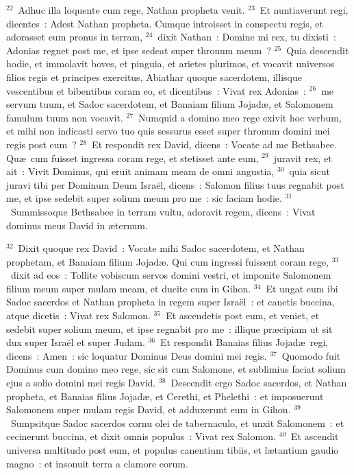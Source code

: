 ${}^{22}$~Adhuc illa loquente cum rege, Nathan propheta venit.
${}^{23}$~Et nuntiaverunt regi, dicentes~: Adest Nathan propheta. Cumque introisset in conspectu regis, et adorasset eum pronus in terram,
${}^{24}$~dixit Nathan~: Domine mi rex, tu dixisti~: Adonias regnet post me, et ipse sedeat super thronum meum~?
${}^{25}$~Quia descendit hodie, et immolavit boves, et pinguia, et arietes plurimos, et vocavit universos filios regis et principes exercitus, Abiathar quoque sacerdotem, illisque vescentibus et bibentibus coram eo, et dicentibus~: Vivat rex Adonias~:
${}^{26}$~me servum tuum, et Sadoc sacerdotem, et Banaiam filium Jojad\ae , et Salomonem famulum tuum non vocavit.
${}^{27}$~Numquid a domino meo rege exivit hoc verbum, et mihi non indicasti servo tuo quis sessurus esset super thronum domini mei regis post eum~?
${}^{28}$~Et respondit rex David, dicens~: Vocate ad me Bethsabee. Qu\ae\ cum fuisset ingressa coram rege, et stetisset ante eum,
${}^{29}$~juravit rex, et ait~: Vivit Dominus, qui eruit animam meam de omni angustia,
${}^{30}$~quia sicut juravi tibi per Dominum Deum Isra\"el, dicens~: Salomon filius tuus regnabit post me, et ipse sedebit super solium meum pro me~: sic faciam hodie.
${}^{31}$~Summissoque Bethsabee in terram vultu, adoravit regem, dicens~: Vivat dominus meus David in \ae ternum.


${}^{32}$~Dixit quoque rex David~: Vocate mihi Sadoc sacerdotem, et Nathan prophetam, et Banaiam filium Jojad\ae . Qui cum ingressi fuissent coram rege,
${}^{33}$~dixit ad eos~: Tollite vobiscum servos domini vestri, et imponite Salomonem filium meum super mulam meam, et ducite eum in Gihon.
${}^{34}$~Et ungat eum ibi Sadoc sacerdos et Nathan propheta in regem super Isra\"el~: et canetis buccina, atque dicetis~: Vivat rex Salomon.
${}^{35}$~Et ascendetis post eum, et veniet, et sedebit super solium meum, et ipse regnabit pro me~: illique pr\ae cipiam ut sit dux super Isra\"el et super Judam.
${}^{36}$~Et respondit Banaias filius Jojad\ae\ regi, dicens~: Amen~: sic loquatur Dominus Deus domini mei regis.
${}^{37}$~Quomodo fuit Dominus cum domino meo rege, sic sit cum Salomone, et sublimius faciat solium ejus a solio domini mei regis David.
${}^{38}$~Descendit ergo Sadoc sacerdos, et Nathan propheta, et Banaias filius Jojad\ae , et Cerethi, et Phelethi~: et imposuerunt Salomonem super mulam regis David, et adduxerunt eum in Gihon.
${}^{39}$~Sumpsitque Sadoc sacerdos cornu olei de tabernaculo, et unxit Salomonem~: et cecinerunt buccina, et dixit omnis populus~: Vivat rex Salomon.
${}^{40}$~Et ascendit universa multitudo post eum, et populus canentium tibiis, et l\ae tantium gaudio magno~: et insonuit terra a clamore eorum.


